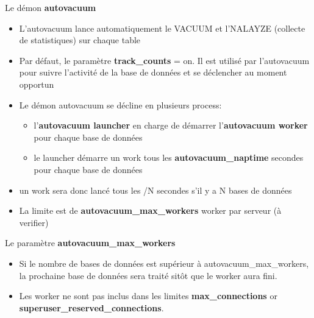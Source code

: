 
\begin{frame}{Le démon \textbf{autovacuum}}

\begin{itemize}
   \item L'autovacuum lance automatiquement le VACUUM et l'NALAYZE (collecte de statistiques) sur chaque table
   \item Par défaut, le paramètre \textbf{track\_counts} = on. Il est utilisé par l'autovacuum pour suivre l'activité de la base de données et se déclencher au moment opportun
   \item Le démon autovacuum se décline en plusieurs process:
   \begin{itemize}
      \item l'\textbf{autovacuum launcher} en charge de démarrer l'\textbf{autovacuum worker} pour chaque base de données
      \item le launcher démarre un work tous les \textbf{autovacuum\_naptime} secondes pour chaque base de données
   \end{itemize}
   \item un work sera donc lancé tous les /N secondes s'il y a N bases de données
   \item La limite est de \textbf{autovacuum\_max\_workers} worker par serveur (à verifier)

\end{itemize}

\end{frame}


\begin{frame}{Le paramètre \textbf{autovacuum\_max\_workers}}

\begin{itemize}
   \item Si le nombre de bases de données est supérieur à autovacuum\_max\_workers, la prochaine base de données sera traité sitôt que le worker aura fini.
   \item Les worker ne sont pas inclus dans les limites \textbf{max\_connections} or \textbf{superuser\_reserved\_connections}.

\end{itemize}

\begin{toile}
\end{toile}

\end{frame}

